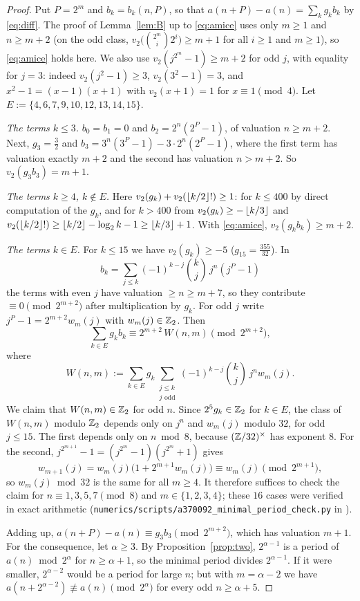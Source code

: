 \documentclass[11pt]{amsart}
\begin{document}
\begin{proof}
Put $P=2^m$ and $b_k=b_k(n,P)$, so that $a(n+P)-a(n)=\sum_kg_kb_k$ by \eqref{eq:diff}. The proof of Lemma~\ref{lem:B} up to \eqref{eq:amice} uses only $m\ge1$ and $n\ge m+2$ (on the odd class, $v_2\bigl(\binom{2^m}i2^i\bigr)\ge m+1$ for all $i\ge1$ and $m\ge1$), so \eqref{eq:amice} holds here. We also use $v_2(j^{2^m}-1)\ge m+2$ for odd $j$, with equality for $j=3$: indeed $v_2(j^2-1)\ge3$, $v_2(3^2-1)=3$, and $x^2-1=(x-1)(x+1)$ with $v_2(x+1)=1$ for $x\equiv1\pmod4$. Let $E:=\{4,6,7,9,10,12,13,14,15\}$.

\emph{The terms $k\le3$.} $b_0=b_1=0$ and $b_2=2^n(2^P-1)$, of valuation $n\ge m+2$. Next, $g_3=\frac32$ and $b_3=3^n(3^P-1)-3\cdot2^n(2^P-1)$, where the first term has valuation exactly $m+2$ and the second has valuation $n>m+2$. So $v_2(g_3b_3)=m+1$.

\emph{The terms $k\ge4$, $k\notin E$.} Here $v_2(g_k)+v_2(\left\lfloor k/2\right\rfloor!)\ge1$: for $k\le400$ by direct computation of the $g_k$, and for $k>400$ from $v_2(g_k)\ge-\left\lfloor k/3\right\rfloor$ and $v_2(\left\lfloor k/2\right\rfloor!)\ge\left\lfloor k/2\right\rfloor-\log_2k-1\ge\left\lfloor k/3\right\rfloor+1$. With \eqref{eq:amice}, $v_2(g_kb_k)\ge m+2$.

\emph{The terms $k\in E$.} For $k\le15$ we have $v_2(g_k)\ge-5$ ($g_{15}=\frac{355}{32}$). In
\[ b_k=\sum_{j\le k}(-1)^{k-j}\binom kj\,j^n(j^P-1) \]
the terms with even $j$ have valuation $\ge n\ge m+7$, so they contribute $\equiv0\pmod{2^{m+2}}$ after multiplication by $g_k$. For odd $j$ write $j^P-1=2^{m+2}w_m(j)$ with $w_m(j)\in\mathbb{Z}_2$. Then
\[ \sum_{k\in E}g_kb_k\equiv2^{m+2}\,W(n,m)\pmod{2^{m+2}}, \]
where
\[ W(n,m):=\sum_{k\in E}g_k\sum_{\substack{j\le k\\ j\text{ odd}}}(-1)^{k-j}\binom kj\,j^nw_m(j). \]
We claim that $W(n,m)\in\mathbb{Z}_2$ for odd $n$. Since $2^5g_k\in\mathbb{Z}_2$ for $k\in E$, the class of $W(n,m)$ modulo $\mathbb{Z}_2$ depends only on $j^n$ and $w_m(j)$ modulo $32$, for odd $j\le15$. The first depends only on $n\bmod8$, because $(\mathbb{Z}/32)^\times$ has exponent $8$. For the second, $j^{2^{m+1}}-1=(j^{2^m}-1)(j^{2^m}+1)$ gives
\[ w_{m+1}(j)=w_m(j)\bigl(1+2^{m+1}w_m(j)\bigr)\equiv w_m(j)\pmod{2^{m+1}}, \]
so $w_m(j)\bmod32$ is the same for all $m\ge4$. It therefore suffices to check the claim for $n\equiv1,3,5,7\pmod8$ and $m\in\{1,2,3,4\}$; these $16$ cases were verified in exact arithmetic (\texttt{numerics/scripts/a370092\_minimal\_period\_check.py} in \cite{repo}).

Adding up, $a(n+P)-a(n)\equiv g_3b_3\pmod{2^{m+2}}$, which has valuation $m+1$. For the consequence, let $\alpha\ge3$. By Proposition~\ref{prop:two}, $2^{\alpha-1}$ is a period of $a(n)\bmod2^\alpha$ for $n\ge\alpha+1$, so the minimal period divides $2^{\alpha-1}$. If it were smaller, $2^{\alpha-2}$ would be a period for large $n$; but with $m=\alpha-2$ we have $a(n+2^{\alpha-2})\not\equiv a(n)\pmod{2^\alpha}$ for every odd $n\ge\alpha+5$.
\end{proof}
\end{document}
